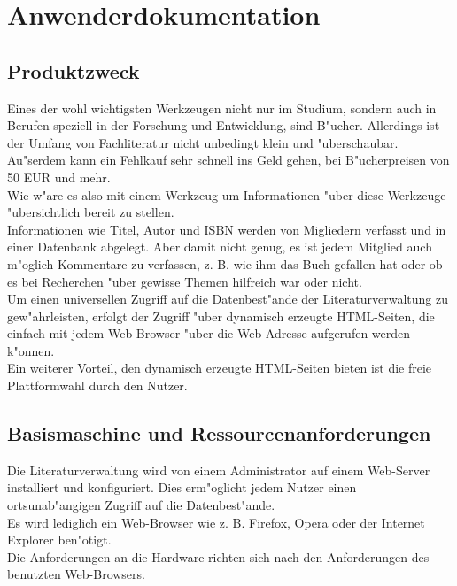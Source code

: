 \chapter{Anwenderdokumentation}
\section{Produktzweck}
Eines der wohl wichtigsten Werkzeugen nicht nur im Studium, sondern 
auch in Berufen speziell in der Forschung und Entwicklung, sind B"ucher. 
Allerdings ist der Umfang von Fachliteratur nicht unbedingt klein und 
"uberschaubar. Au"serdem kann ein Fehlkauf sehr schnell ins Geld gehen, 
bei B"ucherpreisen von 50 EUR und mehr.\\
Wie w"are es also mit einem Werkzeug um Informationen "uber diese 
Werkzeuge "ubersichtlich bereit zu stellen.\\
Informationen wie Titel, Autor und ISBN werden von 
Migliedern verfasst und in einer Datenbank abgelegt. Aber 
damit nicht genug, es ist jedem Mitglied auch m"oglich Kommentare zu 
verfassen, z. B. wie ihm das Buch gefallen hat oder ob es bei Recherchen "uber gewisse Themen
hilfreich war oder nicht.\\
Um einen universellen Zugriff auf die Datenbest"ande der Literaturverwaltung zu gew"ahrleisten, 
erfolgt der Zugriff "uber dynamisch erzeugte HTML-Seiten, die einfach 
mit jedem Web-Browser "uber die Web-Adresse aufgerufen werden k"onnen.\\
Ein weiterer Vorteil, den dynamisch erzeugte HTML-Seiten bieten ist die freie Plattformwahl durch den Nutzer.

\section{Basismaschine und Ressourcenanforderungen}
Die Literaturverwaltung wird von einem Administrator auf einem Web-Server installiert und konfiguriert. Dies erm"oglicht jedem Nutzer einen ortsunab"angigen Zugriff auf die Datenbest"ande.\\
Es wird lediglich ein Web-Browser wie z. B. Firefox, Opera oder der Internet Explorer ben"otigt.\\
Die Anforderungen an die Hardware richten sich nach den Anforderungen des benutzten Web-Browsers.

